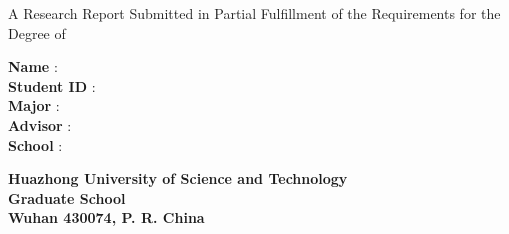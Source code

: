\begin{titlepage}

\Large   
\centering    
 
    A Research Report Submitted in Partial Fulfillment of the Requirements for the Degree of \degree
    
\vspace{3cm}
 
    \textbf{\Huge \myentitle}
    
\vspace{4cm}
 
\flushleft
\setlength{\leftskip}{1cm}
\large

    \textbf{Name} \hspace{1.43cm}        : \hspace{0.3cm}  \myauthor \\
    \textbf{Student ID} \hspace{0.33cm}  : \hspace{0.3cm}  \studentid \\
    \textbf{Major} \hspace{1.32cm}      : \hspace{0.3cm}  \major \\
    \textbf{Advisor} \hspace{1cm}       : \hspace{0.3cm}  \advisor \\
    \textbf{School} \hspace{1.25cm}      : \hspace{0.3cm}  \school

\vfill

\centering

    \textbf{
    Huazhong University of Science and Technology \\
    Graduate School \\
    Wuhan 430074, P. R. China \\
    \mydate}

\end{titlepage}